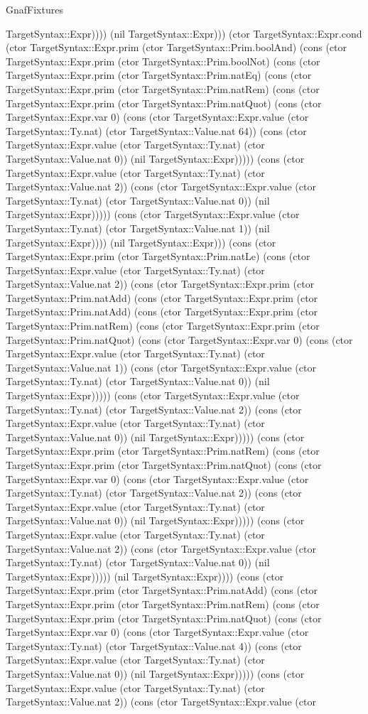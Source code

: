 \begin{lexlean}{GnafFixtures}
\begin{semanticmodule}
{TargetSyntax::Expr)))) (nil TargetSyntax::Expr))) (ctor TargetSyntax::Expr.cond (ctor TargetSyntax::Expr.prim (ctor TargetSyntax::Prim.boolAnd) (cons (ctor TargetSyntax::Expr.prim (ctor TargetSyntax::Prim.boolNot) (cons (ctor TargetSyntax::Expr.prim (ctor TargetSyntax::Prim.natEq) (cons (ctor TargetSyntax::Expr.prim (ctor TargetSyntax::Prim.natRem) (cons (ctor TargetSyntax::Expr.prim (ctor TargetSyntax::Prim.natQuot) (cons (ctor TargetSyntax::Expr.var 0) (cons (ctor TargetSyntax::Expr.value (ctor TargetSyntax::Ty.nat) (ctor TargetSyntax::Value.nat 64)) (cons (ctor TargetSyntax::Expr.value (ctor TargetSyntax::Ty.nat) (ctor TargetSyntax::Value.nat 0)) (nil TargetSyntax::Expr))))) (cons (ctor TargetSyntax::Expr.value (ctor TargetSyntax::Ty.nat) (ctor TargetSyntax::Value.nat 2)) (cons (ctor TargetSyntax::Expr.value (ctor TargetSyntax::Ty.nat) (ctor TargetSyntax::Value.nat 0)) (nil TargetSyntax::Expr))))) (cons (ctor TargetSyntax::Expr.value (ctor TargetSyntax::Ty.nat) (ctor TargetSyntax::Value.nat 1)) (nil TargetSyntax::Expr)))) (nil TargetSyntax::Expr))) (cons (ctor TargetSyntax::Expr.prim (ctor TargetSyntax::Prim.natLe) (cons (ctor TargetSyntax::Expr.value (ctor TargetSyntax::Ty.nat) (ctor TargetSyntax::Value.nat 2)) (cons (ctor TargetSyntax::Expr.prim (ctor TargetSyntax::Prim.natAdd) (cons (ctor TargetSyntax::Expr.prim (ctor TargetSyntax::Prim.natAdd) (cons (ctor TargetSyntax::Expr.prim (ctor TargetSyntax::Prim.natRem) (cons (ctor TargetSyntax::Expr.prim (ctor TargetSyntax::Prim.natQuot) (cons (ctor TargetSyntax::Expr.var 0) (cons (ctor TargetSyntax::Expr.value (ctor TargetSyntax::Ty.nat) (ctor TargetSyntax::Value.nat 1)) (cons (ctor TargetSyntax::Expr.value (ctor TargetSyntax::Ty.nat) (ctor TargetSyntax::Value.nat 0)) (nil TargetSyntax::Expr))))) (cons (ctor TargetSyntax::Expr.value (ctor TargetSyntax::Ty.nat) (ctor TargetSyntax::Value.nat 2)) (cons (ctor TargetSyntax::Expr.value (ctor TargetSyntax::Ty.nat) (ctor TargetSyntax::Value.nat 0)) (nil TargetSyntax::Expr))))) (cons (ctor TargetSyntax::Expr.prim (ctor TargetSyntax::Prim.natRem) (cons (ctor TargetSyntax::Expr.prim (ctor TargetSyntax::Prim.natQuot) (cons (ctor TargetSyntax::Expr.var 0) (cons (ctor TargetSyntax::Expr.value (ctor TargetSyntax::Ty.nat) (ctor TargetSyntax::Value.nat 2)) (cons (ctor TargetSyntax::Expr.value (ctor TargetSyntax::Ty.nat) (ctor TargetSyntax::Value.nat 0)) (nil TargetSyntax::Expr))))) (cons (ctor TargetSyntax::Expr.value (ctor TargetSyntax::Ty.nat) (ctor TargetSyntax::Value.nat 2)) (cons (ctor TargetSyntax::Expr.value (ctor TargetSyntax::Ty.nat) (ctor TargetSyntax::Value.nat 0)) (nil TargetSyntax::Expr))))) (nil TargetSyntax::Expr)))) (cons (ctor TargetSyntax::Expr.prim (ctor TargetSyntax::Prim.natAdd) (cons (ctor TargetSyntax::Expr.prim (ctor TargetSyntax::Prim.natRem) (cons (ctor TargetSyntax::Expr.prim (ctor TargetSyntax::Prim.natQuot) (cons (ctor TargetSyntax::Expr.var 0) (cons (ctor TargetSyntax::Expr.value (ctor TargetSyntax::Ty.nat) (ctor TargetSyntax::Value.nat 4)) (cons (ctor TargetSyntax::Expr.value (ctor TargetSyntax::Ty.nat) (ctor TargetSyntax::Value.nat 0)) (nil TargetSyntax::Expr))))) (cons (ctor TargetSyntax::Expr.value (ctor TargetSyntax::Ty.nat) (ctor TargetSyntax::Value.nat 2)) (cons (ctor TargetSyntax::Expr.value (ctor }
\end{semanticmodule}
\end{lexlean}
